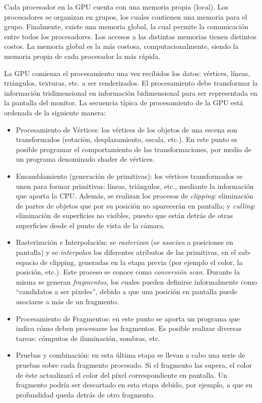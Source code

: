 Cada procesador en la GPU cuenta con una memoria propia (local).
Los procesadores se organizan en grupos, los cuales contienen una memoria para el grupo.
Finalmente, existe una memoria global, la cual permite la comunicación entre todos los procesadores.
Los accesos a las distintas memorias tienen distintos costos.
La memoria global es la más costosa, computacionalmente, siendo la memoria propia de cada procesador la más rápida.

La GPU comienza el procesamiento una vez recibidos los datos: vértices, líneas, triángulos, texturas, etc. a ser renderizados.
El procesamiento debe transformar la información tridimensional en información bidimensional para ser representada en la pantalla del monitor.
La secuencia t\'ipica de procesamiento de la GPU est\'a ordenada de la siguiente manera:
\begin{itemize}
\item Procesamiento de V\'ertices: los v\'ertices de los objetos de una escena son transformados (rotación, desplazamiento, escala, etc.).
En este punto es posible programar el comportamiento de las transformaciones, por medio de un programa denominado shader de vértices.
\item Ensamblamiento (generación de primitivas): los v\'ertices transformados se unen para formar primitivas: l\'ineas, tri\'angulos, etc., mediante la informaci\'on que aporta la CPU.
Además, se realizan los procesos de {\em clipping}: eliminaci\'on de partes de objetos que por su posici\'on no aparecer\'an en pantalla; y {\em culling}: eliminaci\'on de superficies no visibles, puesto que est\'an detr\'as de otras superficies desde el punto de vista de la c\'amara.
\item Rasterización e Interpolaci\'on: se {\em rasterizan} (se {\em asocian} a posiciones en pantalla) y se {\em interpolan} los diferentes atributos de las primitivas, en el sub-espacio de clipping, generadas en la etapa previa (por ejemplo el color, la posición, etc.).
Este proceso se conoce como {\em conversi\'on scan}.
Durante la misma se generan {\em fragmentos}, los cuales pueden definirse informalmente como ``candidatos a ser p\'ixeles'', debido a que una posición en pantalla puede asociarse a más de un fragmento.
\item Procesamiento de Fragmentos: en este punto se aporta un programa que indica cómo deben procesarse los fragmentos.
Es posible realizar diversas tareas: cómputos de iluminación, sombras, etc.
\item Pruebas y combinación: en esta \'ultima etapa se llevan a cabo una serie de pruebas sobre cada fragmento procesado.
Si el fragmento las supera, el color de éste actualizará el color del píxel correspondiente en pantalla.
Un fragmento podría ser descartado en esta etapa debido, por ejemplo, a que su profundidad queda detrás de otro fragmento.
\end{itemize}

